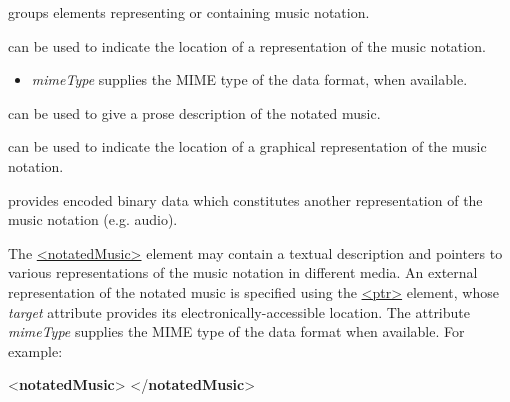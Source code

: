 \begin{sansreflist}
  
\item \textbf{\hyperlink{TEI.notatedMusic}{}} groups elements representing or containing music notation.
\item \textbf{\hyperlink{TEI.ptr}{}} can be used to indicate the location of a representation of the music notation. \mbox{}\\[-10pt] \begin{itemize}
\item {\itshape mimeType} supplies the MIME type of the data format, when available.
\end{itemize} 
\item \textbf{\hyperlink{TEI.desc}{}} can be used to give a prose description of the notated music.
\item \textbf{\hyperlink{TEI.graphic}{}} can be used to indicate the location of a graphical representation of the music notation.
\item \textbf{\hyperlink{TEI.binaryObject}{}} provides encoded binary data which constitutes another representation of the music notation (e.g. audio).
\end{sansreflist}
\par
The \hyperref[TEI.notatedMusic]{<notatedMusic>} element may contain a textual description and pointers to various representations of the music notation in different media. An external representation of the notated music is specified using the \hyperref[TEI.ptr]{<ptr>} element, whose {\itshape target} attribute provides its electronically-accessible location. The attribute {\itshape mimeType} supplies the MIME type of the data format when available. For example:\par\bgroup{}\exampleFont \begin{shaded}\noindent\mbox{}{<\textbf{notatedMusic}>}\mbox{}\newline 
{}\mbox{}\newline 
{</\textbf{notatedMusic}>}\end{shaded}\egroup\par \par
